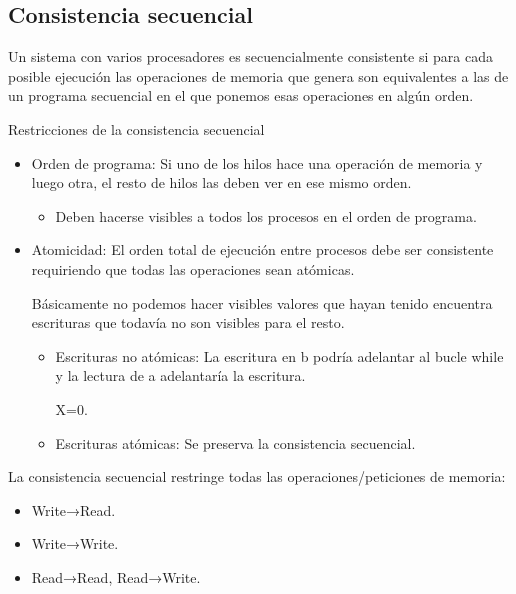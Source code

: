 \documentclass[12pt, twoside, openright]{report} %
\begin{document}
\subsection{Consistencia secuencial}

    Un sistema con varios procesadores es secuencialmente consistente
    si para cada posible ejecución las operaciones de memoria que
    genera son equivalentes a las de un programa secuencial en el que
    ponemos esas operaciones en algún orden.

    Restricciones de la consistencia secuencial

    \begin{itemize}
    \item
      Orden de programa: Si uno de los hilos hace una operación de
      memoria y luego otra, el resto de hilos las deben ver en ese
      mismo orden.

      \begin{itemize}
      
      \item
        Deben hacerse visibles a todos los procesos en el orden de
        programa.
      \end{itemize}
    \item
      Atomicidad: El orden total de ejecución entre procesos debe ser
      consistente requiriendo que todas las operaciones sean atómicas.

      Básicamente no podemos hacer visibles valores que hayan tenido
    encuentra escrituras que todavía no son visibles para el resto.

   \begin{itemize}
     \item Escrituras no atómicas: La escritura en b podría adelantar al bucle while y la
lectura de a adelantaría la escritura.

X=0.
     \item Escrituras atómicas: Se preserva la consistencia secuencial.
   \end{itemize}
  \end{itemize}
    

  
    La consistencia secuencial restringe todas las
    operaciones/peticiones de memoria:

    \begin{itemize}
    
    \item
      Write→Read.
    \item
      Write→Write.
    \item
      Read→Read, Read→Write.
    \end{itemize}
\end{document}
